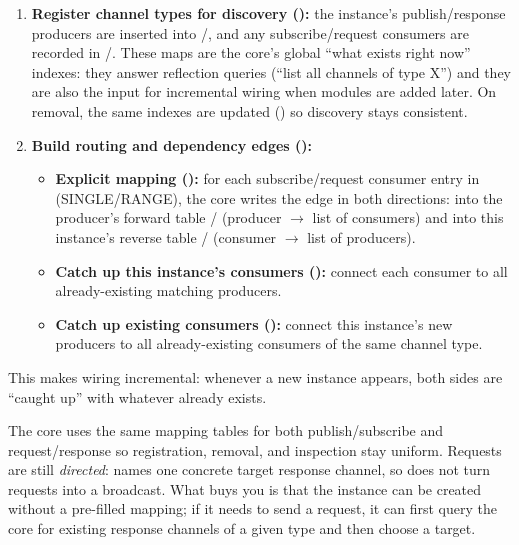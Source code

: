 \begin{enumerate}
    \item \textbf{Register channel types for discovery ():}
    the instance's publish/response producers are inserted into /, and any  subscribe/request consumers are recorded in /.
    These maps are the core's global ``what exists right now'' indexes:
    they answer reflection queries (``list all channels of type X'') and they are also the input for incremental  wiring when modules are added later.
    On removal, the same indexes are updated () so discovery stays consistent.

    \item \textbf{Build routing and dependency edges ():}
    \begin{itemize}
        \item \textbf{Explicit mapping ():}
        for each subscribe/request consumer entry in  (SINGLE/RANGE),
        the core writes the edge in both directions:
        into the producer's forward table / (producer $\rightarrow$ list of consumers)
        and into this instance's reverse table / (consumer $\rightarrow$ list of producers).
        \item \textbf{Catch up this instance's  consumers ():}
        connect each  consumer to all already-existing matching producers.
        \item \textbf{Catch up existing  consumers ():}
        connect this instance's new producers to all already-existing  consumers of the same channel type.
    \end{itemize}
\end{enumerate}

This makes  wiring incremental: whenever a new instance appears, both sides are ``caught up'' with whatever already exists.

The core uses the same mapping tables for both publish/subscribe and request/response so registration, removal, and inspection stay uniform.
Requests are still \emph{directed}:  names one concrete target response channel, so  does not turn requests into a broadcast.
What  buys you is that the instance can be created without a pre-filled mapping; if it needs to send a request, it can first query the core for existing response channels of a given type and then choose a target.

